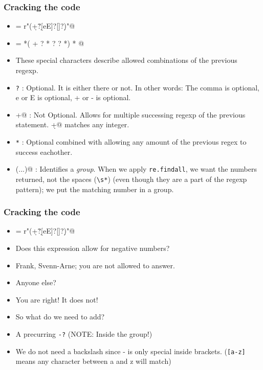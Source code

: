 \documentclass{beamer}
\begin{document}
\begin{frame}[fragile]
\frametitle{Cracking the code}
\scriptsize
\begin{itemize}
 \item \verb@anyNumber = r"\s*(\d+\.?\d*[eE]?[\-\+]?\d*)\s*"@
 \pause \item \verb@anyNumber =     *(  +  ?  *    ?      ?  *)  * @  
 \item These special characters describe allowed combinations of the previous regexp.
 \pause \item \verb+?+ : Optional. It is either there or not. In other words: The comma is optional, e or E is optional, + or - is optional.
 \pause \item \verb@+@ : Not Optional. Allows for multiple successing regexp of the previous statement. \verb@\d+@ matches any integer.
 \pause \item \verb+*+ : Optional combined with allowing any amount of the previous regex to success eachother.
 \pause \item \verb@(...)@ : Identifies a \textit{group}. When we apply \verb+re.findall+, we want the numbers returned, not the spaces (\verb+\s*+) (even though they are a part of the regexp pattern); we put the matching number in a group.
\end{itemize}
\normalsize
\end{frame}


\begin{frame}[fragile]
\frametitle{Cracking the code}
\scriptsize
\begin{itemize}
\item \verb@anyNumber = r"\s*(\d+\.?\d*[eE]?[\-\+]?\d*)\s*"@
\pause \item Does this expression allow for negative numbers?
\pause \item Frank, Svenn-Arne; you are not allowed to answer.
\pause \item Anyone else?
\pause \item You are right! It does not!
\item So what do we need to add?
\pause \item A precurring \verb+-?+ (NOTE: Inside the group!)
\pause \item We do not need a backslash since - is only special inside brackets. (\verb+[a-z]+ means any character between a and z will match)
\end{itemize}
\normalsize
\end{frame}
\end{document}
